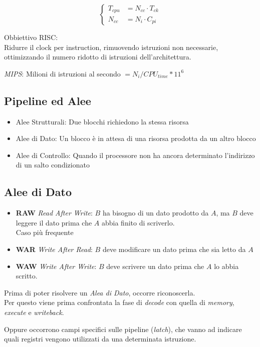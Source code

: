 \documentclass[a4paper,10pt]{article}
\begin{document}
\[
\begin{cases}
    T_{cpu} &= N_{cc} \cdot T_{ck}
    \\
    N_{cc} &= N_i \cdot C_{pi}
\end{cases}
\]


Obbiettivo RISC:
\\
Ridurre il clock per instruction, rimuovendo istruzioni non necessarie, ottimizzando il numero ridotto di istruzioni dell'architettura.

\textit{MIPS}: Milioni di istruzioni al secondo $ = N_i / CPU_{time} * 11^6$

\subsection{Pipeline ed Alee}
\begin{itemize}
    \item Alee Strutturali: Due blocchi richiedono la stessa risorsa
    \item Alee di Dato: Un blocco è in attesa di una risorsa prodotta da un altro blocco
    \item Alee di Controllo: Quando il processore non ha ancora determinato l'indirizzo di un salto condizionato
\end{itemize}

\subsection{Alee di Dato}
\begin{itemize}
    \item \textbf{RAW} \textit{Read After Write}:
        $B$ ha bisogno di un dato prodotto da $A$, ma $B$ deve leggere il dato prima che $A$ abbia finito di scriverlo.
        \\
        Caso più frequente
    \item \textbf{WAR} \textit{Write After Read}:
        $B$ deve modificare un dato prima che sia letto da $A$
    \item \textbf{WAW} \textit{Write After Write}:
        $B$ deve scrivere un dato prima che $A$ lo abbia scritto.
\end{itemize}

Prima di poter risolvere un \textit{Alea di Dato}, occorre riconoscerla.
\\
Per questo viene prima confrontata la fase di \textit{decode} con quella di \textit{memory}, \textit{execute} e \textit{writeback}.

Oppure occorrono campi specifici sulle pipeline (\textit{latch}), che vanno ad indicare quali registri vengono utilizzati da una determinata istruzione.
\end{document}
